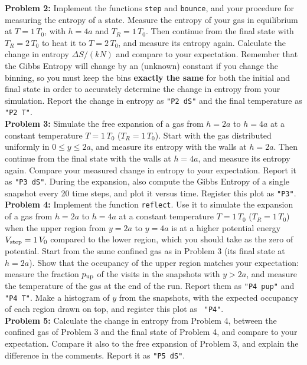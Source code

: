 \documentclass[12pt]{article}
\begin{document}
\noindent
{\bf Problem 2:} Implement the functions {\tt step} and {\tt bounce},
and your procedure for measuring the entropy of a state.  Measure the
entropy of your gas in equilibrium at $T
= 1\,T_0$, with $h = 4a$ and $T_R = 1\,T_0$.  Then continue from the
final state with $T_R = 2\,T_0$ to heat it to $T = 2\,T_0$, and measure
its entropy again.  Calculate the change in entropy $\Delta S/(kN)$ and
compare to your expectation.  Remember that the Gibbs Entropy will
change by an (unknown) constant if you change the binning, so you must
keep the bins {\bf exactly the same} for both the initial and final
state in order to accurately determine the change in entropy from your
simulation.  Report the change in entropy as {\tt "P2 dS"} and the
final temperature as {\tt "P2 T"}.\\[3pt]

\noindent
{\bf Problem 3:} Simulate the free expansion of a gas from $h=2a$ to $h=4a$
at a constant temperature $T = 1\,T_0$ ($T_R = 1\,T_0$).  Start with
the gas distributed uniformly in $0 \le y \le 2a$, and measure its
entropy with the walls at $h = 2a$.  Then continue from the final
state with the walls at $h = 4a$, and measure its entropy again.
Compare your measured change in entropy to your expectation.  Report
it as {\tt "P3 dS"}.  During the expansion, also compute the Gibbs
Entropy of a single snapshot every 20 time steps, and plot it versus
time.  Register this plot as {\tt "P3"}.\\[3pt]

\noindent
{\bf Problem 4:} Implement the function {\tt reflect}.  Use it to
simulate the expansion of a gas from $h=2a$ to $h=4a$ at a constant
temperature $T = 1\,T_0$ ($T_R = 1\,T_0$) when the upper region from
$y=2a$ to $y=4a$ is at a higher potential energy $V_{\rm step} = 1\,V_0$
compared to the lower region, which you should take as the zero of
potential.  Start from the same confined gas as in Problem 3 (its final
state at $h=2a$).  Show that the occupancy of the upper region matches
your expectation: measure the fraction $p_{\rm up}$ of the visits in
the snapshots with $y > 2a$, and measure the temperature of the gas at
the end of the run.  Report them as {\tt "P4 pup"} and {\tt "P4 T"}.
Make a histogram of $y$ from the snapshots, with the expected
occupancy of each region drawn on top, and register this plot as {\tt
  "P4"}.\\[3pt]

\noindent
{\bf Problem 5:} Calculate the change in entropy from Problem 4,
between the confined gas of Problem 3 and the final state of Problem 4,
and compare to your expectation.  Compare it also to the free expansion
of Problem 3, and explain the difference in the comments.  Report it as
{\tt "P5 dS"}.\\[3pt]
\end{document}
